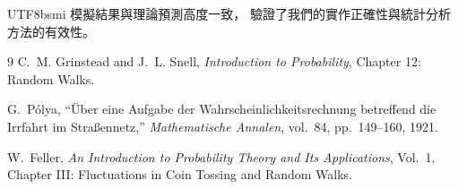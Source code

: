 \documentclass[12pt, a4paper]{article}
\begin{document}
\begin{CJK}{UTF8}{bsmi}
模擬結果與理論預測高度一致，
驗證了我們的實作正確性與統計分析方法的有效性。

\begin{thebibliography}{9}
    C.~M. Grinstead and J.~L. Snell,
    \textit{Introduction to Probability},
    Chapter 12: Random Walks.

    G.~Pólya,
    ``Über eine Aufgabe der Wahrscheinlichkeitsrechnung betreffend die Irrfahrt im Straßennetz,''
    \textit{Mathematische Annalen}, vol.~84, pp.~149--160, 1921.

    W.~Feller,
    \textit{An Introduction to Probability Theory and Its Applications},
    Vol.~1, Chapter III: Fluctuations in Coin Tossing and Random Walks.
\end{thebibliography}

\end{CJK}
\end{document}

